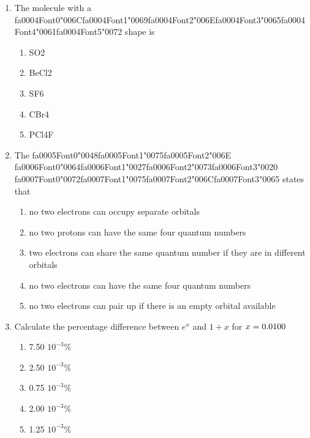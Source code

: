 \documentclass[12pt]{article}
\begin{document}
\begin{enumerate}[label=\arabic*.]
\begin{enumerate}[label=(\alph*)]
    \item It causes the pH to become extremely basic.
    \item It neutralizes the pH completely.
    \item It significantly decreases the pH.
\end{enumerate}
\item The molecule with a {\csname fa0004Font0\endcsname\char"006C}{\csname fa0004Font1\endcsname\char"0069}{\csname fa0004Font2\endcsname\char"006E}{\csname fa0004Font3\endcsname\char"0065}{\csname fa0004Font4\endcsname\char"0061}{\csname fa0004Font5\endcsname\char"0072} shape is
\begin{enumerate}[label=(\alph*)]
    \item SO2
    \item BeCl2
    \item SF6
    \item CBr4
    \item PCl4F
\end{enumerate}
\item The {\csname fa0005Font0\endcsname\char"0048}{\csname fa0005Font1\endcsname\char"0075}{\csname fa0005Font2\endcsname\char"006E} {\csname fa0006Font0\endcsname\char"0064}{\csname fa0006Font1\endcsname\char"0027}{\csname fa0006Font2\endcsname\char"0073}{\csname fa0006Font3\endcsname\char"0020} {\csname fa0007Font0\endcsname\char"0072}{\csname fa0007Font1\endcsname\char"0075}{\csname fa0007Font2\endcsname\char"006C}{\csname fa0007Font3\endcsname\char"0065} states that
\begin{enumerate}[label=(\alph*)]
    \item no two electrons can occupy separate orbitals
    \item no two protons can have the same four quantum numbers
    \item two electrons can share the same quantum number if they are in different orbitals
    \item no two electrons can have the same four quantum numbers
    \item no two electrons can pair up if there is an empty orbital available
\end{enumerate}
\item Calculate the percentage difference between $e^x$ and $1+x$ for $x={\char"0030}{\char"002E}{\char"0030}{\csname fa0008Font3\endcsname\char"0031}{\csname fa0008Font4\endcsname\char"0030}{\char"0030}$
\begin{enumerate}[label=(\alph*)]
    \item 7.50 $10^{-3} \%$
    \item 2.50 $10^{-3} \%$
    \item 0.75 $10^{-3} \%$
    \item 2.00 $10^{-3} \%$
    \item 1.25 $10^{-3} \%$
\end{enumerate}
\end{enumerate}
\end{document}
